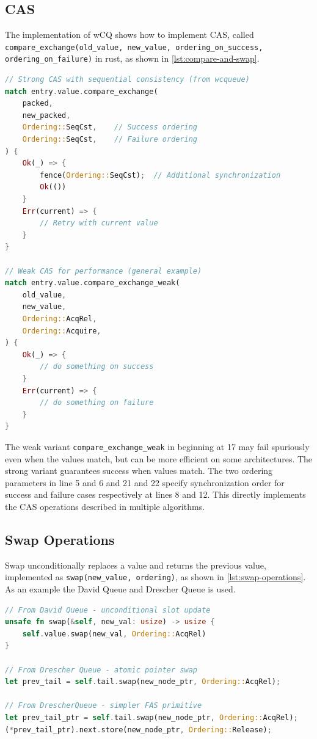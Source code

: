 \subsection{\acf{CAS}}

The implementation of \ac{wCQ} shows how to implement \ac{CAS}, called \newline \texttt{compare\_exchange(old\_value, new\_value, ordering\_on\_success, \newline ordering\_on\_failure)} in rust, as shown in \cref{lst:compare-and-swap}.

\begin{lstlisting}[language=Rust, style=boxed, caption={Compare-and-swap variants and usage patterns}, label={lst:compare-and-swap}]
// Strong CAS with sequential consistency (from wcqueue)
match entry.value.compare_exchange(
    packed,
    new_packed,
    Ordering::SeqCst,    // Success ordering
    Ordering::SeqCst,    // Failure ordering
) {
    Ok(_) => {
        fence(Ordering::SeqCst);  // Additional synchronization
        Ok(())
    }
    Err(current) => {
        // Retry with current value
    }
}

// Weak CAS for performance (general example)
match entry.value.compare_exchange_weak(
    old_value,
    new_value,
    Ordering::AcqRel,
    Ordering::Acquire,
) {
    Ok(_) => {
        // do something on success
    }
    Err(current) => {
        // do something on failure
    }
}
\end{lstlisting}

The weak variant \texttt{compare\_exchange\_weak} in beginning at 17 may fail spuriously even when the values match, but can be more efficient on some architectures. The strong variant guarantees success when values match. The two ordering parameters in line 5 and 6 and 21 and 22 specify synchronization order for success and failure cases respectively at lines 8 and 12. This directly implements the CAS operations described in multiple algorithms.

\subsection{Swap Operations}

Swap unconditionally replaces a value and returns the previous value, implemented as \texttt{swap(new\_value, ordering)}, as shown in \cref{lst:swap-operations}. As an example the David Queue and Drescher Queue is used.

\begin{lstlisting}[language=Rust, style=boxed, caption={Unconditional atomic swap operations}, label={lst:swap-operations}]
// From David Queue - unconditional slot update
unsafe fn swap(&self, new_val: usize) -> usize {
    self.value.swap(new_val, Ordering::AcqRel)
}

// From Drescher Queue - atomic pointer swap
let prev_tail = self.tail.swap(new_node_ptr, Ordering::AcqRel);

// From DrescherQueue - simpler FAS primitive
let prev_tail_ptr = self.tail.swap(new_node_ptr, Ordering::AcqRel);
(*prev_tail_ptr).next.store(new_node_ptr, Ordering::Release);
\end{lstlisting}

